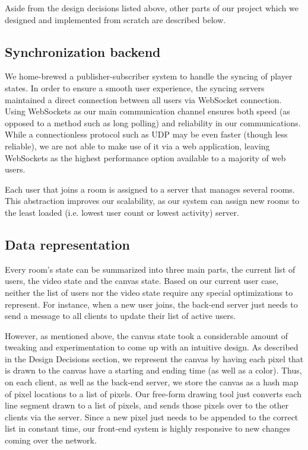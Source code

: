 \documentclass[conference]{IEEEtran}
\begin{document}
    Aside from the design decisions listed above, other parts of our project which we designed and implemented from scratch are described below.

\subsection{Synchronization backend}

    We home-brewed a publisher-subscriber system to handle the syncing of player states. In order to ensure a smooth user experience, the syncing servers maintained a direct connection between all users via WebSocket connection. Using WebSockets as our main communication channel ensures both speed (as opposed to a method such as long polling) and reliability in our communications. While a connectionless protocol such as UDP may be even faster (though less reliable), we are not able to make use of it via a web application, leaving WebSockets as the highest performance option available to a majority of web users.

    Each user that joins a room is assigned to a server that manages several rooms. This abstraction improves our scalability, as our system can assign new rooms to the least loaded (i.e. lowest user count or lowest activity) server.


\subsection{Data representation}

    Every room's state can be summarized into three main parts, the current list of users, the video state and the canvas state. Based on our current user case, neither the list of users nor the video state require any special optimizations to represent. For instance, when a new user joins, the back-end server just needs to send a message to all clients to update their list of active users.

    However, as mentioned above, the canvas state took a considerable amount of tweaking and experimentation to come up with an intuitive design. As described in the Design Decisions section, we represent the canvas by having each pixel that is drawn to the canvas have a starting and ending time (as well as a color). Thus, on each client, as well as the back-end server, we store the canvas as a hash map of pixel locations to a list of pixels. Our free-form drawing tool just converts each line segment drawn to a list of pixels, and sends those pixels over to the other clients via the server. Since a new pixel just needs to be appended to the correct list in constant time, our front-end system is highly responsive to new changes coming over the network.
\end{document}

